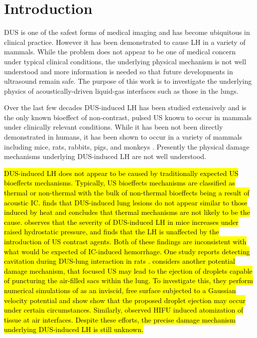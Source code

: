 \section{Introduction}%
\label{sec:introduction}%
%
\ac{DUS} is one of the safest forms of medical imaging and has become
ubiquitous in clinical practice. However it has been demonstrated to
cause \ac{LH} in a variety of mammals. While the problem does not
appear to be one of medical concern under typical clinical conditions,
the underlying physical mechanism is not well understood and more
information is needed so that future developments in ultrasound remain
safe. The purpose of this work is to investigate the underlying
physics of acoustically-driven liquid-gas interfaces such as those in
the lungs.

Over the last few decades \ac{DUS}-induced \ac{LH} has been studied
extensively and is the only known bioeffect of non-contrast, pulsed
\ac{US} known to occur in mammals under clinically relevant
conditions. While it has been not been directly demonstrated in
humans, it has been shown to occur in a variety of mammals including
mice, rats, rabbits, pigs, and monkeys
\citep{Child1990,OBrien2006a,Tarantal1994a}. Presently the physical
damage mechanisms underlying \ac{DUS}-induced \ac{LH} are not well
understood.

\hl{
\ac{DUS}-induced \ac{LH} does not appear to be caused by traditionally
expected \ac{US} bioeffects mechanisms. Typically, \ac{US} bioeffects
mechanisms are classified as thermal or non-thermal with the bulk of
non-thermal bioeffects being a result of acoustic
\ac{IC}. \cite{Zachary2006} finds that \ac{DUS}-induced lung lesions
do not appear similar to those induced by heat and concludes that
thermal mechanisms are not likely to be the cause. \cite{OBrien2000}
observes that the severity of \ac{DUS}-induced \ac{LH} in mice
increases under raised hydrostatic pressure, and \cite{Raeman1996}
finds that the \ac{LH} is unaffected by the introduction of \ac{US}
contrast agents. Both of these findings are inconsistent with what
would be expected of \ac{IC}-induced hemorrhage. One study reports
detecting cavitation during \ac{DUS}-lung interaction in rats
\cite{Holland1996}. \cite{Tjan2007} considers another potential damage
mechanism, that focused \ac{US} may lead to the ejection of droplets
capable of puncturing the air-filled sacs within the lung. To
investigate this, they perform numerical simulations of as an
inviscid, free surface subjected to a Gaussian velocity potential and
show show that the proposed droplet ejection may occur under certain
circumstances. Similarly, \cite{Simon2012} observed \ac{HIFU} induced
atomization of tissue at air interfaces. Despite these efforts, the
precise damage mechanism underlying \ac{DUS}-induced \ac{LH} is still
unknown.
}

